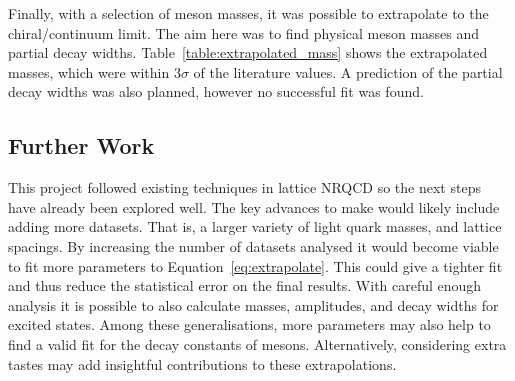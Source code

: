 \documentclass[a4paper,12pt]{article}
\begin{document}
Finally, with a selection of meson masses, it was possible to extrapolate to the chiral/continuum limit. The aim here was to find physical meson masses and partial decay widths. Table~\ref{table:extrapolated_mass} shows the extrapolated masses, which were within $3\sigma$ of the literature values. A prediction of the partial decay widths was also planned, however no successful fit was found.

\subsection{Further Work}
This project followed existing techniques in lattice NRQCD so the next steps have already been explored well. The key advances to make would likely include adding more datasets. That is, a larger variety of light quark masses, and lattice spacings. By increasing the number of datasets analysed it would become viable to fit more parameters to Equation~\ref{eq:extrapolate}. This could give a tighter fit and thus reduce the statistical error on the final results. With careful enough analysis it is possible to also calculate masses, amplitudes, and decay widths for excited states. Among these generalisations, more parameters may also help to find a valid fit for the decay constants of mesons. Alternatively, considering extra tastes may add insightful contributions to these extrapolations.

\clearpage
\printbibliography{}
\end{document}
